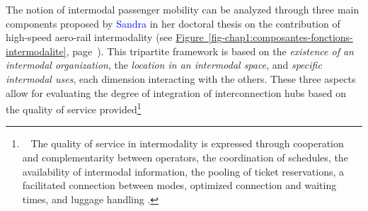 \begin{refsegment}
The notion of intermodal passenger mobility can be analyzed through three main components proposed by \textcolor{blue}{Sandra} \textcolor{blue}{\textcite[167]{bozzani_grandes_2006}} in her doctoral thesis on the contribution of high-speed aero-rail intermodality (see \hyperref[fig-chap1:composantes-fonctions-intermodalite]{Figure~\ref{fig-chap1:composantes-fonctions-intermodalite}}, page~\pageref{fig-chap1:composantes-fonctions-intermodalite}). This tripartite framework is based on the \textsl{existence of an intermodal organization}, the \textsl{location in an intermodal space}, and \textsl{specific intermodal uses}, each dimension interacting with the others. These three aspects allow for evaluating the degree of integration of interconnection hubs based on the quality of service provided\footnote{~
    The quality of service in intermodality is expressed through cooperation and complementarity between operators, the coordination of schedules, the availability of intermodal information, the pooling of ticket reservations, a facilitated connection between modes, optimized connection and waiting times, and luggage handling \textcolor{blue}{\autocites[65]{bozzani_intermodalite_2005}[167]{bozzani_grandes_2006}}.
}
\end{refsegment}
